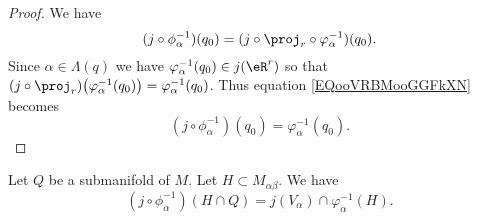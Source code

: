 \begin{proof}
	We have
	\begin{equation}	\label{EQooVRBMooGGFkXN}
		(j\circ\phi_{\alpha}^{-1})(q_0)=(j\circ\proj_r\circ\varphi_{\alpha}^{-1})(q_0).
	\end{equation}
	Since \( \alpha\in\Lambda(q)\) we have \( \varphi_{\alpha}^{-1}(q_0)\in j(\eR^r)\) so that \( (j\circ\proj_r)\big( \varphi_{\alpha}^{-1}(q_0) \big)=\varphi_{\alpha}^{-1}(q_0)\). Thus equation \eqref{EQooVRBMooGGFkXN} becomes
	\begin{equation}
		(j\circ\phi_{\alpha}^{-1})(q_0)=\varphi_{\alpha}^{-1}(q_0).
	\end{equation}
\end{proof}

\begin{lemma}	\label{LEMooDGZVooBPBSow}
	Let \( Q\) be a submanifold of \( M\). Let \( H\subset M_{\alpha\beta} \). We have
	\begin{equation}
		(j\circ\phi_{\alpha}^{-1})(H\cap Q)=j(V_{\alpha})\cap\varphi_{\alpha}^{-1}(H).
	\end{equation}
\end{lemma}

